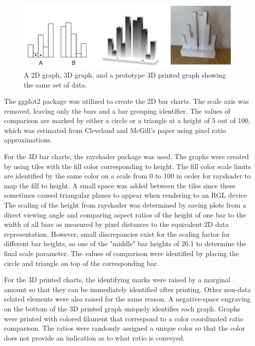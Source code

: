 \documentclass[10pt]{article}
\begin{document}
\begin{figure}[ht]
\begin{center}
\centerline{\includegraphics[width=\columnwidth]{chart_types}}
\caption{A 2D graph, 3D graph, and a prototype 3D printed graph showing the same set of data.}
\label{chartcomparison}
\end{center}
\end{figure}
The ggplot2 package was utilized to create the 2D bar charts.
The scale axis was removed, leaving only the bars and a bar grouping identifier. 
The values of comparison are marked by either a circle or a triangle at a height of 5 out of 100, which was estimated from Cleveland and McGill's paper using pixel ratio approximations.

For the 3D bar charts, the rayshader package was used. 
The graphs were created by using tiles with the fill color corresponding to height.
The fill color scale limits are identified by the same color on a scale from 0 to 100 in order for rayshader to map the fill to height.
A small space was added between the tiles since these sometimes caused triangular planes to appear when rendering to an RGL device
The scaling of the height from rayshader was determined by saving plots from a direct viewing angle and comparing aspect ratios of the height of one bar to the width of all bars as measured by pixel distances to the equivalent 2D data representation. 
However, small discrepancies exist for the scaling factor for different bar heights, so one of the "middle" bar heights of 26.1 to determine the final scale parameter. 
The values of comparison were identified by placing the circle and triangle on top of the corresponding bar.

For the 3D printed charts, the identifying marks were raised by a marginal amount so that they can be immediately identified after printing. 
Other non-data related elements were also raised for the same reason.
A negative-space engraving on the bottom of the 3D printed graph uniquely identifies each graph.
Graphs were printed with colored filament that correspond to a color coordinated ratio comparison.
The ratios were randomly assigned a unique color so that the color does not provide an indication as to what ratio is conveyed.
\end{document}
